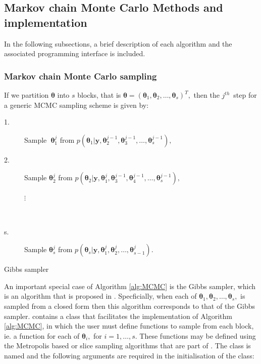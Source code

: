 \documentclass[article]{jss}
\begin{document}
\subsection{Markov chain Monte Carlo Methods and implementation}

In the following subsections, a brief description of each algorithm
and the associated programming interface is included.


\subsubsection{Markov chain Monte Carlo sampling}

If we partition $\bm{\theta}$ into $s$ blocks, that is
$\bm{\bm{\theta}}=\left(\bm{\theta}_{1},\bm{\theta}_{2},\ldots,\bm{\theta}_{s}\right)^{T},$
then the $j^{th}$\ step for a generic MCMC sampling scheme is given
by:

%
\begin{algorithm}[H]
\begin{description}
\item [{\textmd{1.}}] Sample\textbf{\ }$\bm{\theta}_{1}^{j}$ from $p\left(\bm{\theta}_{1}|\bm{y,}\bm{\theta}_{2}^{j-1},\bm{\theta}_{3}^{j-1},\ldots,\bm{\theta}_{s}^{j-1}\right),$ 
\item [{\textmd{2.}}] Sample $\bm{\theta}_{2}^{j}$ from $p\left(\bm{\theta}_{2}|\bm{y,}\bm{\theta}_{1}^{j},\bm{\theta}_{3}^{j-1},\bm{\theta}_{4}^{j-1},\ldots,\bm{\theta}_{s}^{j-1}\right),$

\begin{description}
\item [{$\vdots$}]~
\end{description}
\item [{\textmd{s.}}] Sample $\bm{\theta}_{s}^{j}$ from $p\left(\bm{\theta}_{s}|\bm{y,}\bm{\theta}_{1}^{j},\bm{\theta}_{2}^{j},\ldots,\bm{\theta}_{s-1}^{j}\right).$ 
\end{description}
\caption{Gibbs sampler}
\label{alg:MCMC}
\end{algorithm}

An important special case of Algorithm \ref{alg:MCMC} is the Gibbs
sampler, which is an algorithm that is proposed in
\citet{GelfandSmith1990}. Specficially, when each of
$\bm{\theta}_{1},\bm{\theta}_{2},\dots,\bm{\theta}_{s},$ is sampled
from a closed form then this algorithm corresponds to that of the
Gibbs sampler.  contains a class that facilitates the
implementation of Algorithm \ref{alg:MCMC}, in which the user must
define functions to sample from each block, ie. a function for each of
$\bm{\theta}_{i},$ for $i=1,\dots,s.$ These functions may be defined
using the Metropolis based or slice sampling algorithms that are part
of . The class is named  and the following
arguments are required in the initialisation of the class:
\end{document}
